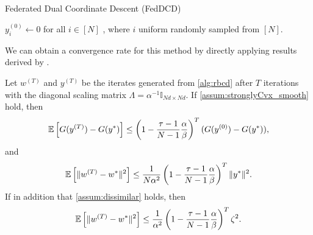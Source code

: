 \begin{algorithm}[t]
    \DontPrintSemicolon
    \caption{Federated Dual Coordinate Descent (FedDCD)\label{alg:rbcd}}
    \smallskip
    $y_i^{(0)} \gets 0$ for all $i \in [N]$
    , where $i$ uniform randomly sampled from $[N]$. 
\end{algorithm}

We can obtain a convergence rate for this method by directly applying results derived by \citet{necoara2017random}.

\begin{theorem} \label{thm:necoaraConvergenceRate}
    Let $w^{(T)}$ and $y^{(T)}$ be the iterates generated from \autoref{alg:rbcd} after $T$ iterations with the diagonal scaling matrix $\Lambda = \alpha^{-1} \mathbb{I}_{Nd \times Nd}$. If \autoref{assum:stronglyCvx_smooth} hold, then
    \begin{equation}
        \mathbb{E} \left[ G( y^{(T)} ) - G( y^* ) \right] \leq \left( 1 - \frac{\tau - 1}{N-1} \frac{\alpha}{\beta} \right)^{T} ( G(y^{(0)}) - G(y^*) ), \label{eq:necoaraDualConvergenceStrongCVX}
    \end{equation}
    and
    \begin{equation}
        \mathbb{E} \left[ \| w^{(T)} - w^* \|^2 \right] 
        \leq \frac{1}{N \alpha^2} \left( 1 - \frac{\tau - 1}{N-1} \frac{\alpha}{\beta} \right)^{T} \|y^*\|^2  \label{eq:necoaraPrimalConvergenceStrongCVX}.
    \end{equation}
    If in addition that \autoref{assum:dissimilar} holds, then
    \begin{equation}
        \mathbb{E} \left[ \| w^{(T)} - w^* \|^2 \right] 
        \leq \frac{1}{\alpha^2} \left( 1 - \frac{\tau - 1}{N-1} \frac{\alpha}{\beta} \right)^{T} \zeta^2. \label{eq:necoaraPrimalConvergenceDissimilar}
    \end{equation}
\end{theorem}

